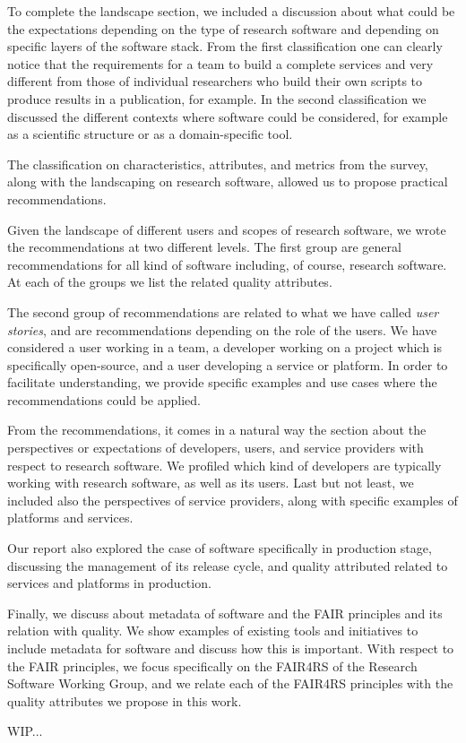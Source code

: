 To complete the landscape section, we included a discussion about what could be the expectations depending on the type of research software and depending on specific layers of the software stack. From the first classification one can clearly notice that the requirements for a team to build a complete services and very different from those of individual researchers who build their own scripts to produce results in a publication, for example. In the second classification we discussed the different contexts where software could be considered, for example as a scientific structure or as a domain-specific tool.

The classification on characteristics, attributes, and metrics from the survey, along with the landscaping on research software, allowed us to propose  practical recommendations.

Given the landscape of different users and scopes of research software, we wrote the recommendations at two different levels. The first group are general recommendations for all kind of software including, of course, research software. At each of the groups we list the related quality attributes.

The second group of recommendations are related to what we have called \textit{user stories}, and are recommendations depending on the role of the users. We have considered a user working in a team, a developer working on a project which is specifically open-source, and a user developing a service or platform.
%
In order to facilitate understanding, we provide specific examples and use cases where the recommendations could be applied.

From the recommendations, it comes in a natural way the section about the perspectives or expectations of developers, users, and service providers with respect to research software. We profiled which kind of developers are typically working with research software, as well as its users. Last but not least, we included also the perspectives of service providers, along with specific examples of platforms and services.

Our report also explored the case of software specifically in production stage, discussing the management of its release cycle, and quality attributed related to services and platforms in production. 

Finally, we discuss about metadata of software and the FAIR principles and its relation with quality. We show examples of existing tools and initiatives to include metadata for software and discuss how this is important. With respect to the FAIR principles, we focus specifically on the FAIR4RS of the Research Software Working Group, and we relate each of the FAIR4RS principles with the quality attributes we propose in this work.

WIP...
